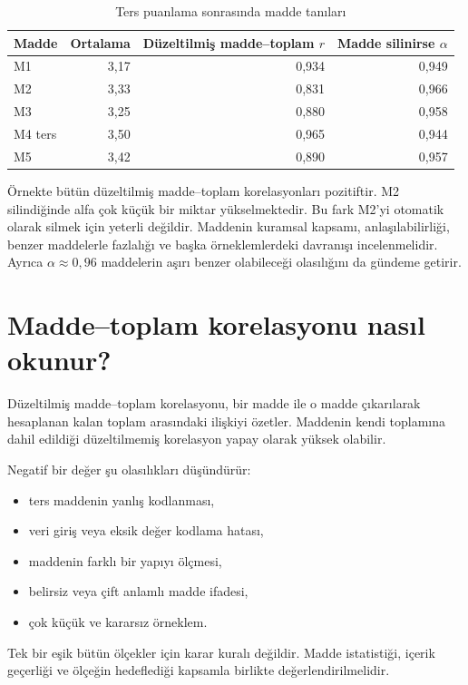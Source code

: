 \begin{table}[htbp]
\centering
\caption{Ters puanlama sonrasında madde tanıları}
\label{tab:reliability-item-diagnostics}
\begin{tabular}{@{}lrrr@{}}
\toprule
Madde & Ortalama & Düzeltilmiş madde--toplam $r$ & Madde silinirse $\alpha$ \\
\midrule
M1 & 3,17 & 0,934 & 0,949 \\
M2 & 3,33 & 0,831 & 0,966 \\
M3 & 3,25 & 0,880 & 0,958 \\
M4 ters & 3,50 & 0,965 & 0,944 \\
M5 & 3,42 & 0,890 & 0,957 \\
\bottomrule
\end{tabular}
\end{table}

Örnekte bütün düzeltilmiş madde--toplam korelasyonları pozitiftir. M2
silindiğinde alfa çok küçük bir miktar yükselmektedir. Bu fark M2'yi otomatik
olarak silmek için yeterli değildir. Maddenin kuramsal kapsamı, anlaşılabilirliği,
benzer maddelerle fazlalığı ve başka örneklemlerdeki davranışı incelenmelidir.
Ayrıca $\alpha\approx0{,}96$ maddelerin aşırı benzer olabileceği olasılığını da
gündeme getirir.

\section{Madde--toplam korelasyonu nasıl okunur?}

Düzeltilmiş madde--toplam korelasyonu, bir madde ile o madde çıkarılarak
hesaplanan kalan toplam arasındaki ilişkiyi özetler. Maddenin kendi toplamına
dahil edildiği düzeltilmemiş korelasyon yapay olarak yüksek olabilir.

Negatif bir değer şu olasılıkları düşündürür:

\begin{itemize}
  \item ters maddenin yanlış kodlanması,
  \item veri giriş veya eksik değer kodlama hatası,
  \item maddenin farklı bir yapıyı ölçmesi,
  \item belirsiz veya çift anlamlı madde ifadesi,
  \item çok küçük ve kararsız örneklem.
\end{itemize}

Tek bir eşik bütün ölçekler için karar kuralı değildir. Madde istatistiği,
içerik geçerliği ve ölçeğin hedeflediği kapsamla birlikte değerlendirilmelidir.

